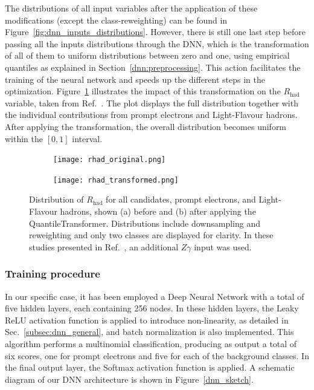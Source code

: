 \begin{figure}[htbp]
\end{figure}


The distributions of all input variables after the application of these modifications (except the class-reweighting) can be found in Figure~\ref{fig:dnn_inputs_distributions}. However, there is still one last step before passing all the inputs distributions through the DNN, which is the transformation of all of them to uniform distributions between zero and one, using empirical quantiles as explained in Section~\ref{dnn:preprocessing}. This action facilitates the training of the neural network and speeds up the different steps in the optimization.
Figure~\ref{fig:transformed} illustrates the impact of this transformation on the $R_{\text{had}}$ variable, taken from Ref.~\cite{dnn_paper}. The plot displays the full distribution together with the individual contributions from prompt electrons and Light-Flavour hadrons. After applying the transformation, the overall distribution becomes uniform within the $[0,1]$ interval.

\begin{figure}[htbp]
  \centering
  \begin{subfigure}[b]{0.45\textwidth}
      \texttt{[image: rhad\_original.png]}
      \caption{}
  \end{subfigure}
  \hfill
  \begin{subfigure}[b]{0.45\textwidth}
      \texttt{[image: rhad\_transformed.png]}
      \caption{}
  \end{subfigure}
  \hfill
  \caption{Distribution of $R_{\text{had}}$ for all candidates, prompt electrons, and Light-Flavour hadrons, shown (a) before and (b) after applying the QuantileTransformer. Distributions include downsampling and reweighting and only two classes are displayed for clarity. In these studies presented in Ref.~\cite{dnn_paper}, an additional $Z\gamma$ input was used.}
  \label{fig:transformed}
\end{figure}

\subsubsection{Training procedure}

In our specific case, it has been employed a Deep Neural Network with a total of five hidden layers, each containing 256 nodes. In these hidden layers, the Leaky ReLU activation function is applied to introduce non-linearity, as detailed in Sec.~\ref{subsec:dnn_general}, and batch normalization is also implemented.  
This algorithm performs a multinomial classification, producing as output a total of six scores, one for prompt electrons and five for each of the background classes. In the final output layer, the Softmax activation function is applied.  
A schematic diagram of our DNN architecture is shown in Figure~\ref{dnn_sketch}.

